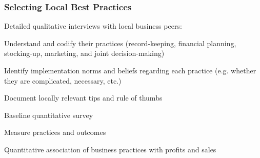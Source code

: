 \documentclass[hideothersubsections, usenames,dvipsnames,11pt]{beamer}
\newenvironment{itemize_2pt}{\itemize\addtolength{\itemsep}{2pt}}{\enditemize}
\begin{document}
\begin{frame}
\frametitle{Selecting Local Best Practices}
\begin{itemize_2pt}
\item Detailed \textcolor{bdf}{qualitative interviews} with local business peers:
    \begin{itemize_2pt}
    \item Understand and codify their practices (record-keeping, financial planning, stocking-up, marketing, and joint decision-making)
    \item Identify implementation norms and beliefs regarding each practice (e.g. whether they are complicated, necessary, etc.)
    \item Document locally relevant tips and rule of thumbs
    \end{itemize_2pt}
\vspace{0.1in}
\item Baseline \textcolor{bdf}{quantitative survey}
    \begin{itemize_2pt}
    \item Measure practices and outcomes
    \item Quantitative association of business practices with profits and sales
    \end{itemize_2pt}
\end{itemize_2pt}
\end{frame}
\end{document}
